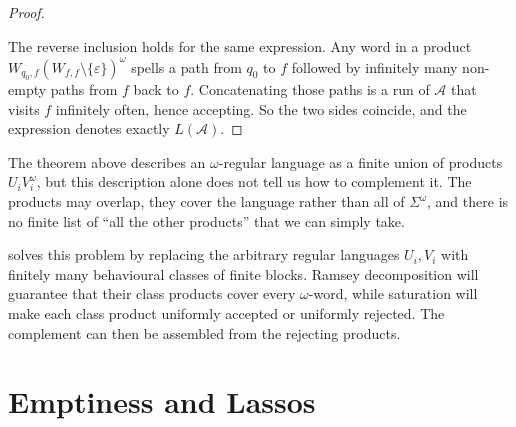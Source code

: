 \begin{proof}
\begin{center}
\end{center}

The reverse inclusion holds for the same expression.  Any word in a
product $W_{q_0,f}(W_{f,f}\setminus\{\varepsilon\})^\omega$ spells a path
from $q_0$ to $f$ followed by infinitely many non-empty paths from $f$
back to $f$.  Concatenating those paths is a run of $\mathcal{A}$ that
visits $f$ infinitely often, hence accepting.  So the two sides coincide,
and the expression denotes exactly $L(\mathcal{A})$.
\end{proof}

\begin{remark}
The theorem above describes an $\omega$-regular language as a finite
union of products $U_iV_i^\omega$, but this description alone does not
tell us how to complement it.  The products may overlap, they cover the
language rather than all of $\Sigma^\omega$, and there is no finite list
of ``all the other products'' that we can simply take.

 solves this problem by replacing the
arbitrary regular languages $U_i,V_i$ with finitely many behavioural
classes of finite blocks.  Ramsey decomposition will guarantee that
their class products cover every $\omega$-word, while saturation will
make each class product uniformly accepted or uniformly rejected.  The
complement can then be assembled from the rejecting products.
\end{remark}


\section{Emptiness and Lassos}
\label{sec:buchi-emptiness}

